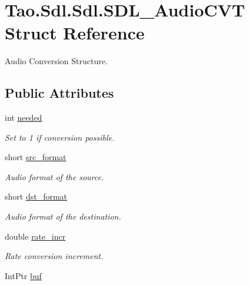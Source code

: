 \hypertarget{struct_tao_1_1_sdl_1_1_sdl_1_1_s_d_l___audio_c_v_t}{
\section{Tao.Sdl.Sdl.SDL\_\-AudioCVT Struct Reference}
\label{struct_tao_1_1_sdl_1_1_sdl_1_1_s_d_l___audio_c_v_t}
}


Audio Conversion Structure.  


\subsection*{Public Attributes}
\begin{DoxyCompactItemize}
\item 
int \hyperlink{struct_tao_1_1_sdl_1_1_sdl_1_1_s_d_l___audio_c_v_t_af623472b2426f08b7cbaab7635012669}{needed}
\begin{DoxyCompactList}\small\item\em Set to 1 if conversion possible. \item\end{DoxyCompactList}\item 
short \hyperlink{struct_tao_1_1_sdl_1_1_sdl_1_1_s_d_l___audio_c_v_t_ad28834c5978683aa99aacc462354922b}{src\_\-format}
\begin{DoxyCompactList}\small\item\em Audio format of the source. \item\end{DoxyCompactList}\item 
short \hyperlink{struct_tao_1_1_sdl_1_1_sdl_1_1_s_d_l___audio_c_v_t_ab7f9d5ab7996bb5d01a7fb9a3b0babb5}{dst\_\-format}
\begin{DoxyCompactList}\small\item\em Audio format of the destination. \item\end{DoxyCompactList}\item 
double \hyperlink{struct_tao_1_1_sdl_1_1_sdl_1_1_s_d_l___audio_c_v_t_af40b193d1692d8530fbb6493516f3b6d}{rate\_\-incr}
\begin{DoxyCompactList}\small\item\em Rate conversion increment. \item\end{DoxyCompactList}\item 
IntPtr \hyperlink{struct_tao_1_1_sdl_1_1_sdl_1_1_s_d_l___audio_c_v_t_a4b59d447082f4bb651fee2d3c540461b}{buf}

\end{DoxyCompactItemize}

